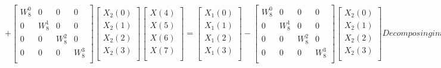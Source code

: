\documentclass[journal,12pt,twocolumn]{IEEEtran}
\renewcommand\thesection{\arabic{section}}
\begin{document}
\begin{enumerate}[label=\arabic*.,ref=\thesection.\theenumi]
\begin{solution}
$$\begin{equation}
+
\begin{bmatrix}
	W_8^{0} & 0 & 0 & 0\\ 
	0 & W_8^{1} & 0 & 0 \\
	0 & 0 & W_8^{2} & 0 \\
	0 & 0 & 0 & W_8^{3} \\
\end{bmatrix}
\begin{bmatrix}
	X_2(0) \\ 
	X_2(1) \\
	X_2(2) \\
	X_2(3) \\
\end{bmatrix}
\end{equation}
\begin{equation}
\begin{bmatrix}
	X(4) \\ 
	X(5) \\
	X(6) \\
	X(7) \\
\end{bmatrix}
=
\begin{bmatrix}
	X_1(0) \\ 
	X_1(1) \\
	X_1(2) \\
	X_1(3) \\
\end{bmatrix}
-
\begin{bmatrix}
	W_8^{0} & 0 & 0 & 0\\ 
	0 & W_8^{1} & 0 & 0 \\
	0 & 0 & W_8^{2} & 0 \\
	0 & 0 & 0 & W_8^{3} \\
\end{bmatrix}
\begin{bmatrix}
	X_2(0) \\ 
	X_2(1) \\
	X_2(2) \\
	X_2(3) \\
\end{bmatrix}
\end{equation}
Decomposing into 2 point dft matrices:
\begin{equation}
	\begin{bmatrix}
	X_{1}(0) \\ 
	X_{1}(1)\\ 
	\end{bmatrix}
	=
	\begin{bmatrix}
	X_{3}(0) \\ 
	X_{3}(1)\\ 

\end{bmatrix}
\end{equation}$$
\end{solution}
\end{enumerate}
\end{document}
